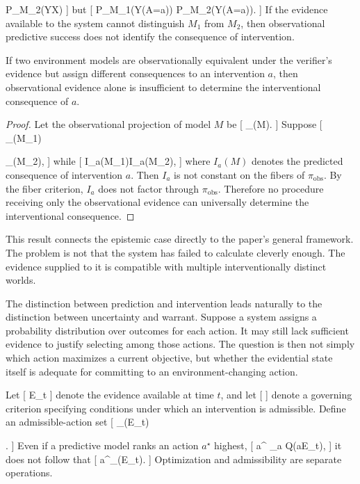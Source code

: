 \documentclass[11pt]{article}
\begin{document}
P_{M_2}(Y\mid X)
]
but
[
P_{M_1}(Y\mid{}(A=a))
\neq
P_{M_2}(Y\mid{}(A=a)).
]
If the evidence available to the system cannot distinguish $M_1$ from $M_2$, then observational predictive success does not identify the consequence of intervention.

\begin{proposition}
If two environment models are observationally equivalent under the verifier's evidence but assign different consequences to an intervention $a$, then observational evidence alone is insufficient to determine the interventional consequence of $a$.
\end{proposition}

\begin{proof}
Let the observational projection of model $M$ be
[
\pi_{}(M).
]
Suppose
[
\pi_{}(M_1)

\pi_{}(M_2),
]
while
[
I_a(M_1)\neq I_a(M_2),
]
where $I_a(M)$ denotes the predicted consequence of intervention $a$. Then $I_a$ is not constant on the fibers of $\pi_{\mathrm{obs}}$. By the fiber criterion, $I_a$ does not factor through $\pi_{\mathrm{obs}}$. Therefore no procedure receiving only the observational evidence can universally determine the interventional consequence.
\end{proof}

This result connects the epistemic case directly to the paper's general framework. The problem is not that the system has failed to calculate cleverly enough. The evidence supplied to it is compatible with multiple interventionally distinct worlds.

The distinction between prediction and intervention leads naturally to the distinction between uncertainty and warrant. Suppose a system assigns a probability distribution over outcomes for each action. It may still lack sufficient evidence to justify selecting among those actions. The question is then not simply which action maximizes a current objective, but whether the evidential state itself is adequate for committing to an environment-changing action.

Let
[
E_t
]
denote the evidence available at time $t$, and let
[
\Gamma
]
denote a governing criterion specifying conditions under which an intervention is admissible. Define an admissible-action set
[
_{\Gamma}(E_t)

.
]
Even if a predictive model ranks an action $a^\star$ highest,
[
a^\star
\in
\arg\max_{a\in{}}
Q(a\mid E_t),
]
it does not follow that
[
a^\star\in{}_{\Gamma}(E_t).
]
Optimization and admissibility are separate operations.
\end{document}
